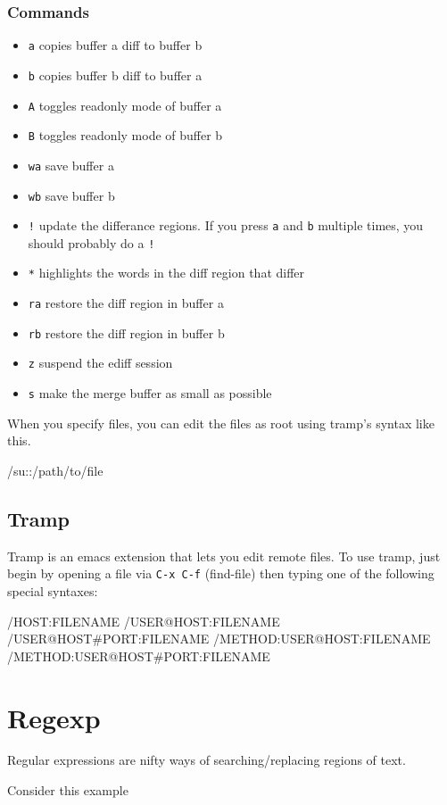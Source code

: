\documentclass[11pt]{article}
\begin{document}
\subsubsection{Commands}
\label{sec:orgheadline27}
\begin{itemize}
\item \texttt{a} copies buffer a diff to buffer b
\item \texttt{b} copies buffer b diff to buffer a
\item \texttt{A} toggles readonly mode of buffer a
\item \texttt{B} toggles readonly mode of buffer b
\item \texttt{wa} save buffer a
\item \texttt{wb} save buffer b
\item \texttt{!} update the differance regions.  If you press \texttt{a} and \texttt{b} multiple times, you should probably do a \texttt{!}
\item \texttt{*} highlights the words in the diff region that differ
\item \texttt{ra} restore the diff region in buffer a
\item \texttt{rb} restore the diff region in buffer b
\item \texttt{z} suspend the ediff session
\item \texttt{s} make the merge buffer as small as possible
\end{itemize}

When you specify files, you can edit the files as root using tramp's syntax like this.

/su::/path/to/file
\subsection{Tramp}
\label{sec:orgheadline29}
Tramp is an emacs extension that lets you edit remote files. To use tramp, just begin by opening a file via \texttt{C-x C-f} (find-file) then typing one of the following special syntaxes:

/HOST:FILENAME
/USER@HOST:FILENAME
/USER@HOST\#PORT:FILENAME
/METHOD:USER@HOST:FILENAME
/METHOD:USER@HOST\#PORT:FILENAME
\section{Regexp}
\label{sec:orgheadline31}
Regular expressions are nifty ways of searching/replacing regions of text.

Consider this example
\end{document}
